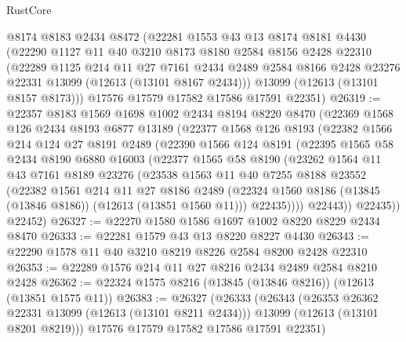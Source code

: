 \begin{lexlean}{RustCore}
\begin{coremodule}
    @8174
    @8183
    @2434
    @8472
    (@22281
      @1553
      @43
      @13
      @8174
      @8181
      @4430
      (@22290
        @1127
        @11
        @40
        @3210
        @8173
        @8180
        @2584
        @8156
        @2428
        @22310
        (@22289
          @1125
          @214
          @11
          @27
          @7161
          @2434
          @2489
          @2584
          @8166
          @2428
          @23276
          @22331
          @13099
          (@12613 (@13101 @8167 @2434)))
        @13099
        (@12613 (@13101 @8157 @8173)))
      @17576
      @17579
      @17582
      @17586
      @17591
      @22351)
@26319 := @22357
    @8183
    @1569
    @1698
    @1002
    @2434
    @8194
    @8220
    @8470
    (@22369
      @1568
      @126
      @2434
      @8193
      @6877
      @13189
      (@22377
        @1568
        @126
        @8193
        (@22382
          @1566
          @214
          @124
          @27
          @8191
          @2489
          (@22390
            @1566
            @124
            @8191
            (@22395
              @1565
              @58
              @2434
              @8190
              @6880
              @16003
              (@22377
                @1565
                @58
                @8190
                (@23262
                  @1564
                  @11
                  @43
                  @7161
                  @8189
                  @23276
                  (@23538
                    @1563
                    @11
                    @40
                    @7255
                    @8188
                    @23552
                    (@22382
                      @1561
                      @214
                      @11
                      @27
                      @8186
                      @2489
                      (@22324 @1560 @8186 (@13845 (@13846 @8186)) (@12613 (@13851 @1560 @11)))
                      @22435))))
              @22443))
          @22435))
      @22452)
@26327 := @22270 @1580 @1586 @1697 @1002 @8220 @8229 @2434 @8470
@26333 := @22281 @1579 @43 @13 @8220 @8227 @4430
@26343 := @22290 @1578 @11 @40 @3210 @8219 @8226 @2584 @8200 @2428 @22310
@26353 := @22289 @1576 @214 @11 @27 @8216 @2434 @2489 @2584 @8210 @2428
@26362 := @22324 @1575 @8216 (@13845 (@13846 @8216)) (@12613 (@13851 @1575 @11))
@26383 := @26327
    (@26333
      (@26343
        (@26353 @26362 @22331 @13099 (@12613 (@13101 @8211 @2434)))
        @13099
        (@12613 (@13101 @8201 @8219)))
      @17576
      @17579
      @17582
      @17586
      @17591
      @22351)

\end{coremodule}
\end{lexlean}
